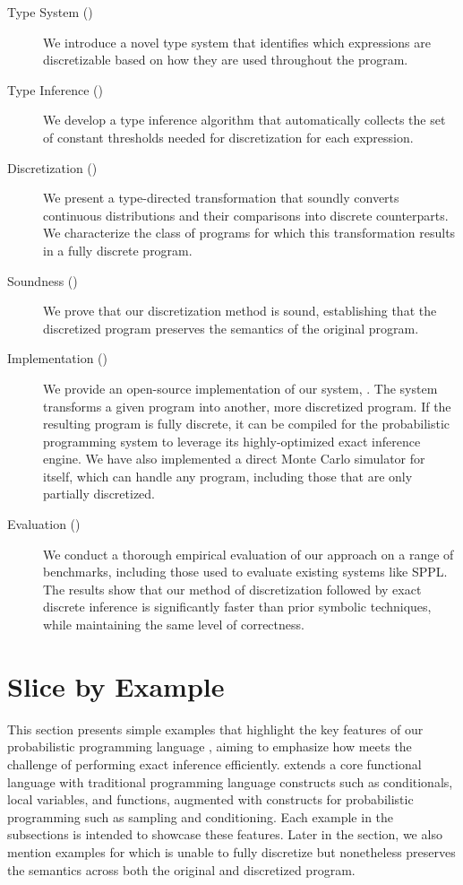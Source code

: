 \documentclass[acmsmall,screen,dvipsnames,x11names,nonacm,anonymous,review]{acmart}
\newcommand{\Slice}{\text{\scshape Slice}\xspace}
\newcommand{\Dice}{\text{\scshape Dice}\xspace}
\begin{document}
\begin{description}
    \item[Type System ()] We introduce a novel type system that identifies which expressions are discretizable based on how they are used throughout the program.

    \item[Type Inference ()] We develop a type inference algorithm that automatically collects the set of constant thresholds needed for discretization for each expression.

    \item[Discretization ()] We present a type-directed transformation that soundly converts continuous distributions and their comparisons into discrete counterparts. We characterize the class of programs for which this transformation results in a fully discrete program.

    \item[Soundness ()] We prove that our discretization method is sound, establishing that the discretized program preserves the semantics of the original program.

    \item[Implementation ()] We provide an open-source implementation of our system, \Slice. The system transforms a given \Slice program into another, more discretized \Slice program. If the resulting program is fully discrete, it can be compiled for the \Dice probabilistic programming system to leverage its highly-optimized exact inference engine. We have also implemented a direct Monte Carlo simulator for \Slice itself, which can handle any program, including those that are only partially discretized.

    \item[Evaluation ()] We conduct a thorough empirical evaluation of our approach on a range of benchmarks, including those used to evaluate existing systems like SPPL. The results show that our method of discretization followed by exact discrete inference is significantly faster than prior symbolic techniques, while maintaining the same level of correctness.
\end{description}

\section{Slice by Example}\label{sec:examples}
This section presents simple examples that highlight the key features of our probabilistic programming language \Slice, aiming to emphasize how \Slice meets the challenge of performing exact inference efficiently. \Slice extends a core functional language with traditional programming language constructs such as conditionals, local variables, and functions, augmented with constructs for probabilistic programming such as sampling and conditioning. Each example in the subsections is intended to showcase these features. Later in the section, we also mention examples for which \Slice is unable to fully discretize but nonetheless preserves the semantics across both the original and discretized program.
\end{document}
